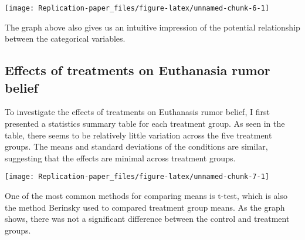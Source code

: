 \documentclass[AER]{AEA}
\begin{document}
\begin{center}\texttt{[image: Replication-paper\_files/figure-latex/unnamed-chunk-6-1]} \end{center}

The graph above also gives us an intuitive impression of the potential
relationship between the categorical variables.

\hypertarget{effects-of-treatments-on-euthanasia-rumor-belief}{%
\subsection{Effects of treatments on Euthanasia rumor
belief}\label{effects-of-treatments-on-euthanasia-rumor-belief}}

\begin{table}

\caption{\label{tab:t test}Effects of rumor on treatments}
\centering
{}
\end{table}

To investigate the effects of treatments on Euthanasis rumor belief, I
first presented a statistics summary table for each treatment group. As
seen in the table, there seems to be relatively little variation across
the five treatment groups. The means and standard deviations of the
conditions are similar, suggesting that the effects are minimal across
treatment groups.

\begin{center}\texttt{[image: Replication-paper\_files/figure-latex/unnamed-chunk-7-1]} \end{center}

One of the most common methods for comparing means is t-test, which is
also the method Berinsky used to compared treatment group means. As the
graph shows, there was not a significant difference between the control
and treatment groups.
\end{document}
